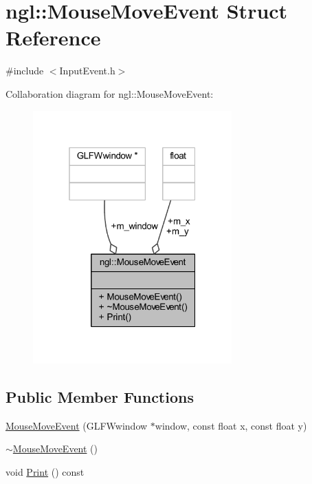 \hypertarget{structngl_1_1_mouse_move_event}{}\section{ngl\+:\+:Mouse\+Move\+Event Struct Reference}
\label{structngl_1_1_mouse_move_event}


{\ttfamily \#include $<$Input\+Event.\+h$>$}



Collaboration diagram for ngl\+:\+:Mouse\+Move\+Event\+:
\nopagebreak
\begin{figure}[H]
\begin{center}
\leavevmode
\includegraphics[width=217pt]{structngl_1_1_mouse_move_event__coll__graph}
\end{center}
\end{figure}
\subsection*{Public Member Functions}
\begin{DoxyCompactItemize}
\item 
\mbox{\hyperlink{structngl_1_1_mouse_move_event_ae042bbcdcf8f44b580f1403496c7bc76}{Mouse\+Move\+Event}} (G\+L\+F\+Wwindow $\ast$window, const float x, const float y)
\item 
\mbox{\hyperlink{structngl_1_1_mouse_move_event_a67938231a8996f8cd69a0d2f7ae1506e}{$\sim$\+Mouse\+Move\+Event}} ()
\item 
void \mbox{\hyperlink{structngl_1_1_mouse_move_event_a1d4fc1e64580451d7ec0d15c2007dc99}{Print}} () const
\end{DoxyCompactItemize}
